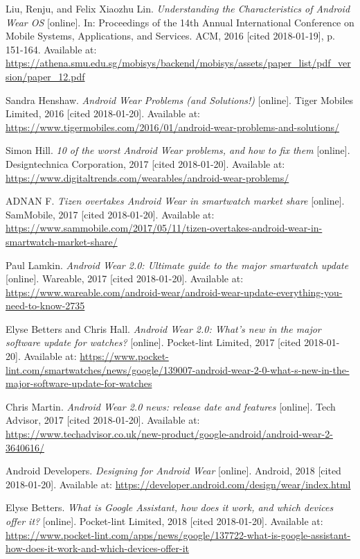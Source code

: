 \begin{thebibliography}{10}
Liu, Renju, and Felix Xiaozhu Lin. \textit{Understanding the Characteristics of Android Wear OS} [online]. In: Proceedings of the 14th Annual International Conference on Mobile Systems, Applications, and Services. ACM, 2016 [cited 2018-01-19], p. 151-164. Available at: \url{https://athena.smu.edu.sg/mobisys/backend/mobisys/assets/paper_list/pdf_version/paper_12.pdf}

Sandra Henshaw. \textit{Android Wear Problems (and Solutions!)} [online]. Tiger Mobiles Limited, 2016 [cited 2018-01-20]. Available at: \url{https://www.tigermobiles.com/2016/01/android-wear-problems-and-solutions/}

Simon Hill. \textit{10 of the worst Android Wear problems, and how to fix them} [online]. Designtechnica Corporation, 2017 [cited 2018-01-20]. Available at: \url{https://www.digitaltrends.com/wearables/android-wear-problems/}

ADNAN F. \textit{Tizen overtakes Android Wear in smartwatch market share} [online]. SamMobile, 2017 [cited 2018-01-20]. Available at: \url{https://www.sammobile.com/2017/05/11/tizen-overtakes-android-wear-in-smartwatch-market-share/}


Paul Lamkin. \textit{Android Wear 2.0: Ultimate guide to the major smartwatch update} [online]. Wareable, 2017 [cited 2018-01-20]. Available at: \url{https://www.wareable.com/android-wear/android-wear-update-everything-you-need-to-know-2735}

Elyse Betters and Chris Hall. \textit{Android Wear 2.0: What's new in the major software update for watches?} [online]. Pocket-lint Limited, 2017 [cited 2018-01-20]. Available at: \url{https://www.pocket-lint.com/smartwatches/news/google/139007-android-wear-2-0-what-s-new-in-the-major-software-update-for-watches}

Chris Martin. \textit{Android Wear 2.0 news: release date and features} [online]. Tech Advisor, 2017 [cited 2018-01-20]. Available at: \url{https://www.techadvisor.co.uk/new-product/google-android/android-wear-2-3640616/}

Android Developers. \textit{Designing for Android Wear} [online]. Android, 2018 [cited 2018-01-20]. Available at: \url{https://developer.android.com/design/wear/index.html}

Elyse Betters. \textit{What is Google Assistant, how does it work, and which devices offer it?} [online]. Pocket-lint Limited, 2018 [cited 2018-01-20]. Available at: \url{https://www.pocket-lint.com/apps/news/google/137722-what-is-google-assistant-how-does-it-work-and-which-devices-offer-it}



\end{thebibliography}
